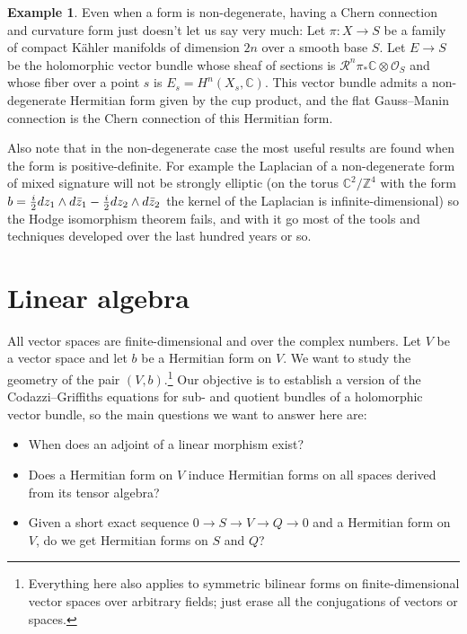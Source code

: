 \documentclass[10pt,a4paper]{amsart}
\theoremstyle{definition}
\newtheorem{exam}[theo]{Example}
\newcommand{\kk}[1]{\mathbb{#1}}
\def\kahler{K\"ahler}
\begin{document}
\begin{exam}
Even when a form is non-degenerate, having a Chern connection and curvature
form just doesn't let us say very much: Let $\pi : X \to S$ be a family of
compact \kahler{} manifolds of dimension $2n$ over a smooth base $S$.
Let $E \to S$ be the holomorphic vector bundle whose sheaf of sections is
$\mathcal R^{n}\pi_{*}\mathbb C \otimes \mathcal O_{S}$ and whose fiber over a
point $s$ is $E_{s} = H^{n}(X_{s}, \mathbb C)$. This vector bundle admits a
non-degenerate Hermitian form given by the cup product, and the flat
Gauss--Manin connection is the Chern connection of this Hermitian form.
\end{exam}

Also note that in the non-degenerate case the most useful results are found
when the form is positive-definite. For example the Laplacian of a
non-degenerate form of mixed signature will not be strongly elliptic
(on the torus $\kk C^2 / \kk Z^4$ with the form $b = \smash{\frac i2}
dz_1 \wedge d \bar z_1 - \smash{\frac i2} dz_2 \wedge d\bar z_2$ the kernel of
the Laplacian is infinite-dimensional)
so the Hodge isomorphism theorem fails, and with it go most of the tools and techniques developed over the last hundred years or so.



\section{Linear algebra}
\label{sec:degenerate-linear-algebra}



All vector spaces are finite-dimensional and over the complex numbers. Let $V$
be a vector space and let $b$ be a Hermitian form on $V$. We want to study the
geometry of the pair $(V,b)$.\footnote{Everything here also applies to
symmetric bilinear forms on finite-dimensional vector spaces over arbitrary
fields; just erase all the conjugations of vectors or spaces.}
Our objective is to establish a version of the Codazzi--Griffiths equations for
sub- and quotient bundles of a holomorphic vector bundle, so the main questions
we want to answer here are:

\begin{itemize}
\item
When does an adjoint of a linear morphism exist?

\item
Does a Hermitian form on $V$ induce Hermitian forms on all spaces derived from its tensor algebra?

\item
Given a short exact sequence $0 \to S \to V \to Q \to 0$ and a Hermitian form on $V$, do we get Hermitian forms on $S$ and $Q$?
\end{itemize}
\end{document}
